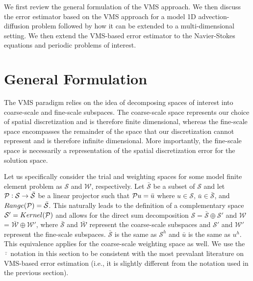 We first review the general formulation of the VMS approach.
We then discuss the error estimator based on the VMS approach for a model 1D advection-diffusion problem followed by how it can be extended to a multi-dimensional setting.
We then extend the VMS-based error estimator to the Navier-Stokes equations and periodic problems of interest.

\section{General Formulation}
\label{sec:VMS_form}


The VMS paradigm relies on the idea of decomposing spaces of interest into coarse-scale and fine-scale subspaces.
The coarse-scale space represents our choice of spatial discretization and is therefore finite dimensional, whereas the fine-scale space encompasses the remainder of the space that our discretization cannot represent and is therefore infinite dimensional.
More importantly, the fine-scale space is necessarily a representation of the spatial discretization error for the solution space.

Let us specifically consider the trial and weighting spaces for some model finite element problem as $\mathcal{S}$ and $\mathcal{W}$, respectively.
Let $\bar{\mathcal{S}}$ be a subset of $\mathcal{S}$ and let $\mathcal{P}: \mathcal{S} \rightarrow \bar{\mathcal{S}}$ be a linear projector such that $\mathcal{P} u = \bar{u}$ where $u \in \mathcal{S}$, $\bar{u} \in \bar{\mathcal{S}}$, and $Range(\mathcal{P})=\bar{\mathcal{S}}$.
This naturally leads to the definition of a complementary space $\mathcal{S}' = Kernel(\mathcal{P})$ and allows for the direct sum decomposition $\mathcal{S} = \bar{\mathcal{S}} \oplus \mathcal{S}'$ and $\mathcal{W}$ = $\bar{\mathcal{W}} \oplus \mathcal{W}'$, where $\bar{\mathcal{S}}$ and $\bar{\mathcal{W}}$ represent the coarse-scale subspaces and $\mathcal{S}'$ and $\mathcal{W}'$ represent the fine-scale subspaces.
$\bar{\mathcal{S}}$ is the same as $\mathcal{S}^h$ and $\bar{u}$ is the same as $u^h$. This equivalence applies for the coarse-scale weighting space as well. 
We use the $\bar{\cdot}$ notation in this section to be consistent with the most prevalant literature on VMS-based error estimation (i.e., it is slightly different from the notation used in the previous section).

